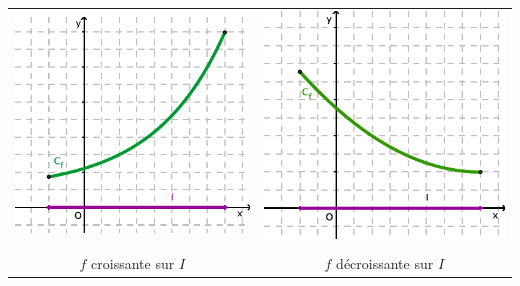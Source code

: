 \begin{center}
  \begin{tabular}{c@{\qquad \qquad}c}
    \begin{minipage}[c]{0.36\linewidth}
      \includegraphics[width=\textwidth]{F_Croissante.pdf}
    \end{minipage}
    &
    \begin{minipage}[c]{0.36\linewidth}
      \includegraphics[width=\textwidth]{F_Decroissante.pdf}
    \end{minipage}  \\
    & \\
    $f$ croissante sur $I$
    &
    $f$ décroissante sur $I$
  \end{tabular}
\end{center}


